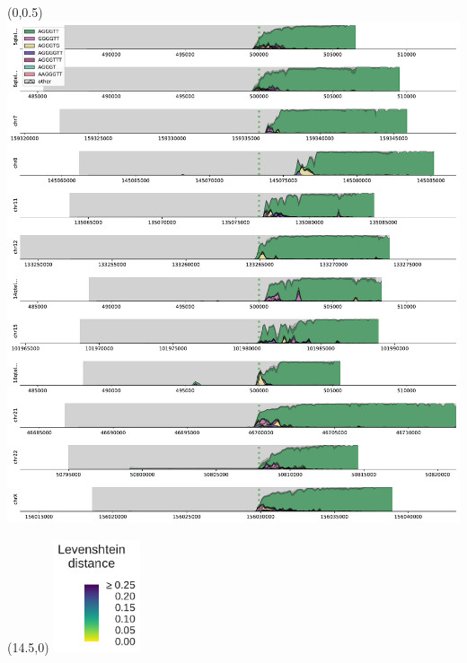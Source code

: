 \documentclass{article}
\begin{document}
\begin{textblock}{13}(0,0.5)      \includegraphics{main-figure-assets/HG002-10kb+15kb-filtered_for_paper-q_arm.pdf}               \end{textblock}

\begin{textblock}{3}(14.5,0)      \includegraphics[height=1.3in]{main-figure-assets/clustermaps/colorbar.pdf}                                   \end{textblock}
\end{document}
